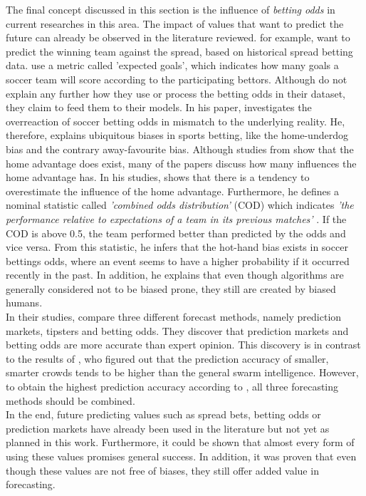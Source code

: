 The final concept discussed in this section is the influence of \emph{betting odds} in current researches in this area. The impact of values that want to predict the future can already be observed in the literature reviewed. \citet{landers_machine_2017} for example, want to predict the winning team against the spread, based on historical spread betting data. \citet{shah_poisson_2021} use a metric called 'expected goals', which indicates how many goals a soccer team will score according to the participating bettors. Although \citet{deng_analysis_2020} do not explain any further how they use or process the betting odds in their dataset, they claim to feed them to their models. In his paper, \citet{wheatcroft_profiting_2020} investigates the overreaction of soccer betting odds in mismatch to the underlying reality. He, therefore, explains ubiquitous biases in sports betting, like the home-underdog bias and the contrary away-favourite bias. Although studies from \citet{nevill_home_1999} show that the home advantage does exist, many of the papers discuss how many influences the home advantage has. \parencite{bonomo_mathematical_2014, landers_machine_2017,shah_poisson_2021,deng_analysis_2020} In his studies, \citet{wheatcroft_profiting_2020} shows that there is a tendency to overestimate the influence of the home advantage. Furthermore, he defines a nominal statistic called \emph{'combined odds distribution'} (COD) which indicates \emph{'the performance relative to expectations of a team in its previous matches'} \parencite[, p. 4]{wheatcroft_profiting_2020}. If the COD is above 0.5, the team performed better than predicted by the odds and vice versa. From this statistic, he infers that the hot-hand bias exists in soccer bettings odds, where an event seems to have a higher probability if it occurred recently in the past. In addition, he explains that even though algorithms are generally considered not to be biased prone, they still are created by biased humans. \\
In their studies, \citet{spann_sports_2009} compare three different forecast methods, namely prediction markets, tipsters and betting odds. They discover that prediction markets and betting odds are more accurate than expert opinion. This discovery is in contrast to the results of \citet{goldstein_wisdom_2014}, who figured out that the prediction accuracy of smaller, smarter crowds tends to be higher than the general swarm intelligence. However, to obtain the highest prediction accuracy according to \citet{spann_sports_2009}, all three forecasting methods should be combined. \\
In the end, future predicting values such as spread bets, betting odds or prediction markets have already been used in the literature but not yet as planned in this work. Furthermore, it could be shown that almost every form of using these values promises general success. In addition, it was proven that even though these values are not free of biases, they still offer added value in forecasting.

